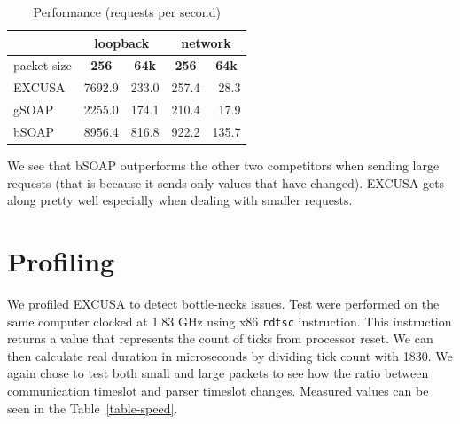 \documentclass[12pt,notitlepage]{report}
\begin{document}
\begin{table}[htb]
\begin{center}
\tabcolsep=6pt
\renewcommand{\arraystretch}{1.3}
\begin{tabular}{|l|r|r|r|r|}
\cline{2-5}
\multicolumn{1}{c|}{} & \multicolumn{2}{c|}{\textbf{loopback}} & \multicolumn{2}{c|}{\textbf{network}}\\
\hline
packet size & \multicolumn{1}{c|}{\textbf{256}} & \multicolumn{1}{c|}{\textbf{64k}}  & \multicolumn{1}{c|}{\textbf{256}} & \multicolumn{1}{c|}{\textbf{64k}} \\ \hline
EXCUSA & 7692.9 & 233.0 & 257.4 & 28.3\\ \hline
gSOAP & 2255.0 & 174.1 & 210.4 & 17.9\\ \hline
bSOAP & 8956.4 & 816.8 & 922.2 & 135.7\\ \hline
\end{tabular}
\end{center}
\caption{Performance (requests per second)}
\label{comparison-performance}
\end{table}

We see that bSOAP outperforms the other two competitors when sending large requests (that is because it sends only values that have changed). EXCUSA gets along pretty well especially when dealing with smaller requests.

\section{Profiling}
\label{results-prof}

We profiled EXCUSA to detect bottle-necks issues. Test were performed on the same computer clocked at 1.83 GHz using x86 \texttt{rdtsc} instruction\cite{intel}. This instruction returns a value that represents the count of ticks from processor reset. We can then calculate real duration in microseconds by dividing tick count with 1830. We again chose to test both small and large packets to see how the ratio between communication timeslot and parser timeslot changes. Measured values can be seen in the Table~\ref{table-speed}.
\end{document}
